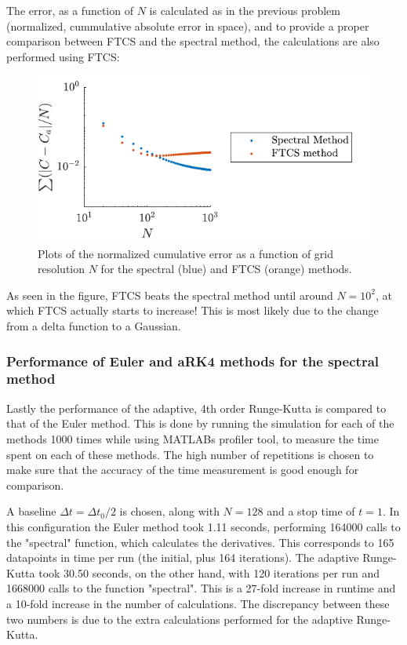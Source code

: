 \documentclass[a4paper,10pt]{article} 	%
\numberwithin{equation}{section}
\begin{document}
	The error, as a function of $ N $ is calculated as in the previous problem (normalized, cummulative absolute error in space), and to provide a proper comparison between FTCS and the spectral method, the calculations are also performed using FTCS:
	\begin{figure}[H]
		\centering
		\includegraphics[width=0.7\linewidth]{spectralError.pdf}
		\caption{Plots of the normalized cumulative error as a function of grid resolution $ N $ for the spectral (blue) and FTCS (orange) methods.}
		\label{fig:spectralError}
	\end{figure}
	As seen in the figure, FTCS beats the spectral method until around $ N = 10^2 $, at which FTCS actually starts to increase! This is most likely due to the change from a delta function to a Gaussian.
	
	
	\subsubsection{Performance of Euler and aRK4 methods for the spectral method}
	Lastly the performance of the adaptive, 4th order Runge-Kutta is compared to that of the Euler method. This is done by running the simulation for each of the methods 1000 times while using MATLABs profiler tool, to measure the time spent on each of these methods. The high number of repetitions is chosen to make sure that the accuracy of the time measurement is good enough for comparison.
	
	A baseline $ \Delta t = \Delta t_0 /2$ is chosen, along with $ N=128 $ and a stop time of $ t=1 $. In this configuration the Euler method took 1.11 seconds, performing 164000 calls to the "spectral" function, which calculates the derivatives. This corresponds to 165 datapoints in time per run (the initial, plus 164 iterations). The adaptive Runge-Kutta took 30.50 seconds, on the other hand, with 120 iterations per run and 1668000 calls to the function "spectral". This is a 27-fold increase in runtime and a 10-fold increase in the number of calculations. The discrepancy between these two numbers is due to the extra calculations performed for the adaptive Runge-Kutta.
	
\end{document}
